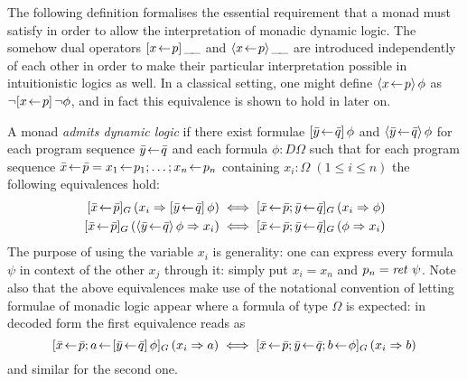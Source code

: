 The following definition formalises the essential requirement that a monad must
satisfy in order to allow the interpretation of monadic dynamic logic. The
somehow dual operators $[x\!\gets\! p]\,\_\!\_$ and $\langle x\!\gets\! p\rangle\,\_\!\_$ are
introduced independently of each other in order to make their particular
interpretation possible in intuitionistic logics as well. In a classical setting,
one might define $\langle x\!\gets\! p\rangle\,{\phi}$ as $\lnot [x\!\gets\! p]\,\lnot \phi$, and in
fact this equivalence is shown to hold in \Isabelle later on.
\begin{defn}
  A monad \emph{admits dynamic logic} if there exist formulae $[\bar
    y\!\gets\! \bar q]\,\phi$ and $\langle\bar y\!\gets\! \bar q\rangle\,\phi$ for each program
  sequence $\bar y\!\gets\! \bar q$ and each formula $\phi : D\Omega$ such that for each program
  sequence $\bar x\!\gets\! \bar p = x_1\!\gets\! p_1; \ldots; x_n\!\gets\! p_n$ containing
  $x_i : \Omega \; (1\leq i\leq n)$ the following equivalences hold:
  \begin{align*}
    \Gdj{\bar x\leteq \bar p}(x_i \Rightarrow \PDLBox{\bar y\leteq\bar q}\phi)
      &\iff \Gdj{\bar x\leteq \bar p; \bar y\leteq\bar q}(x_i \Rightarrow \phi) \\
    \Gdj{\bar x\leteq\bar p}(\PDLDmd{\bar y\leteq\bar q}\phi \Rightarrow x_i)
      &\iff \Gdj{\bar x\leteq\bar p; \bar y\leteq\bar q}(\phi \Rightarrow x_i)
  \end{align*}
  The purpose of using the variable $x_i$ is  generality: one can express
  every formula $\psi$ in context of the other $x_j$ through it: simply put $x_i =
  x_n$ and $p_n = \mathit{ret}~\psi$. Note also that the above equivalences make use of the
  notational convention of letting formulae of monadic logic appear where a
  formula of type $\Omega$ is expected: in decoded form the first equivalence reads
  as 
  \[  \Gdj{\bar x\leteq \bar p; a\leteq \PDLBox{\bar y\leteq\bar q}\phi}(x_i \Rightarrow a)
  \iff \Gdj{\bar x\leteq \bar p; \bar y\leteq\bar q; b\leteq \phi}(x_i \Rightarrow b) \]
  and similar for the second one.
\end{defn}

